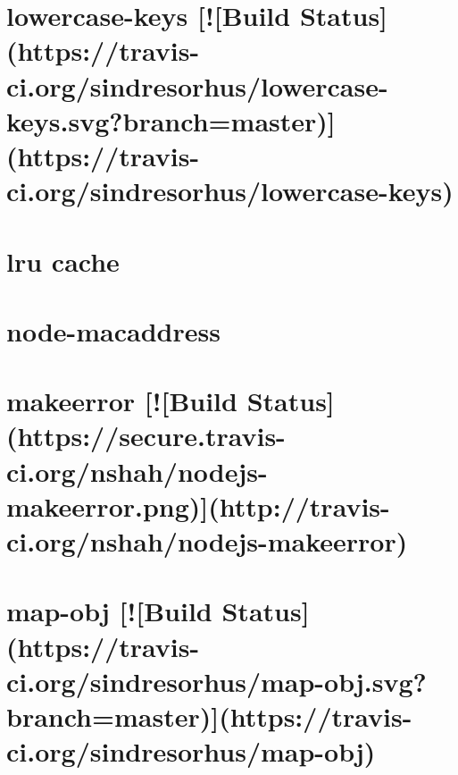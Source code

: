 \documentclass[twoside]{book}
\newcommand{\+}{\discretionary{\mbox{\scriptsize$\hookleftarrow$}}{}{}}
\begin{document}
\chapter{lowercase-\/keys \mbox{[}!\mbox{[}Build Status\mbox{]}(https\+://travis-\/ci.org/sindresorhus/lowercase-\/keys.svg?branch=master)\mbox{]}(https\+://travis-\/ci.org/sindresorhus/lowercase-\/keys)}
\label{md__c_1_workspace_demo_src_main_script_node_modules_lowercase-keys_readme}

\chapter{lru cache}
\label{md__c_1_workspace_demo_src_main_script_node_modules_lru-cache__r_e_a_d_m_e}

\chapter{node-\/macaddress}
\label{md__c_1_workspace_demo_src_main_script_node_modules_macaddress__r_e_a_d_m_e}

\chapter{makeerror \mbox{[}!\mbox{[}Build Status\mbox{]}(https\+://secure.travis-\/ci.org/nshah/nodejs-\/makeerror.png)\mbox{]}(http\+://travis-\/ci.org/nshah/nodejs-\/makeerror)}
\label{md__c_1_workspace_demo_src_main_script_node_modules_makeerror_readme}

\chapter{map-\/obj \mbox{[}!\mbox{[}Build Status\mbox{]}(https\+://travis-\/ci.org/sindresorhus/map-\/obj.svg?branch=master)\mbox{]}(https\+://travis-\/ci.org/sindresorhus/map-\/obj)}
\label{md__c_1_workspace_demo_src_main_script_node_modules_map-obj_readme}

\end{document}
